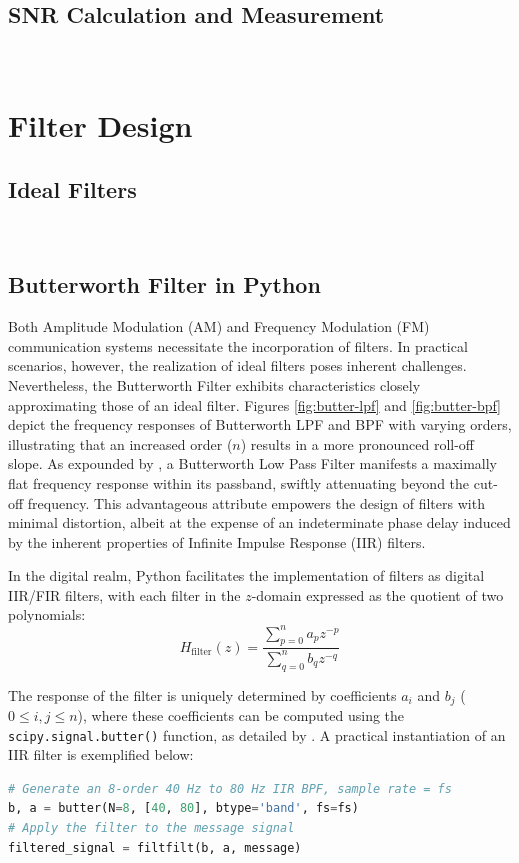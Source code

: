 \documentclass[../ECE459FinalProjectReport.tex]{subfiles}
\begin{document}
\subsection{SNR Calculation and Measurement}
~
\section{Filter Design}
\subsection{Ideal Filters}
~
\subsection{Butterworth Filter in Python}

Both Amplitude Modulation (AM) and Frequency Modulation (FM) communication systems necessitate the incorporation of filters. In practical scenarios, however, the realization of ideal filters poses inherent challenges. Nevertheless, the Butterworth Filter exhibits characteristics closely approximating those of an ideal filter. Figures \ref{fig:butter-lpf} and \ref{fig:butter-bpf} depict the frequency responses of Butterworth LPF and BPF with varying orders, illustrating that an increased order ($n$) results in a more pronounced roll-off slope. As expounded by \cite{storrButterworthFilterDesign2013, kudekiAnalogSignalsSystems2009}, a Butterworth Low Pass Filter manifests a maximally flat frequency response within its passband, swiftly attenuating beyond the cut-off frequency. This advantageous attribute empowers the design of filters with minimal distortion, albeit at the expense of an indeterminate phase delay induced by the inherent properties of Infinite Impulse Response (IIR) filters.

In the digital realm, Python facilitates the implementation of filters as digital IIR/FIR filters, with each filter in the $z$-domain expressed as the quotient of two polynomials:
\begin{equation}
H_{\text{filter}}(z) = \frac{\sum_{p=0}^{n}{a_pz^{-p}}}{\sum_{q=0}^{n}{b_qz^{-q}}}
\end{equation}

The response of the filter is uniquely determined by coefficients $a_i$ and $b_j$ ($0 \leq i, j \leq n$), where these coefficients can be computed using the \verb|scipy.signal.butter()| function, as detailed by \cite{thescipycommunityScipySignalButter, thescipycommunityScipySignalFiltfilt, thescipycommunityScipySignalLfilter}. A practical instantiation of an IIR filter is exemplified below:
\begin{lstlisting}[language=python]
# Generate an 8-order 40 Hz to 80 Hz IIR BPF, sample rate = fs
b, a = butter(N=8, [40, 80], btype='band', fs=fs)
# Apply the filter to the message signal
filtered_signal = filtfilt(b, a, message)
\end{lstlisting}
\end{document}
